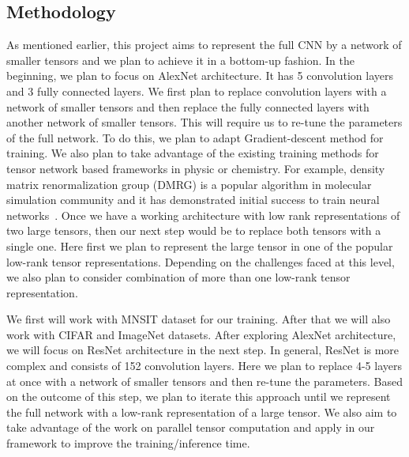 \documentclass[11pt]{article}
\begin{document}
\subsection{Methodology}
As mentioned earlier, this project aims to represent the full CNN by a network of smaller tensors and we plan to achieve it in a bottom-up fashion. In the beginning, we plan to focus on AlexNet architecture. It has 5 convolution layers and 3 fully connected layers. We first plan to replace convolution layers with a network of smaller tensors and then replace the fully connected layers with another network of smaller tensors. This will require us to re-tune the parameters of the full network. To do this, we plan to adapt Gradient-descent method for training. We also plan to take advantage of the existing training methods for tensor network based frameworks in physic or chemistry. For example, density matrix renormalization group (DMRG) is a popular algorithm in molecular simulation community and it has demonstrated initial success to train neural networks~\cite{SS-NIPS2016}. Once we have a working architecture with low rank representations of two large tensors, then our next step would be to replace both tensors with a single one. Here first we plan to represent the large tensor in one of the popular low-rank tensor representations. Depending on the challenges faced at this level, we also plan to consider combination of more than one low-rank tensor representation.    


We first will work with  MNSIT dataset for our training. After that we will also work with CIFAR and ImageNet datasets. After exploring AlexNet architecture, we will focus on ResNet architecture in the next step. In general, ResNet is more complex and consists of 152 convolution layers. Here we plan to replace 4-5 layers at once with a network of smaller tensors and then re-tune the parameters. Based on the outcome of this step, we plan to iterate this approach until we represent the full network with a low-rank representation of a large tensor. We also aim to take advantage of the  work on parallel tensor computation and apply in our framework to improve the training/inference time.

\end{document}
